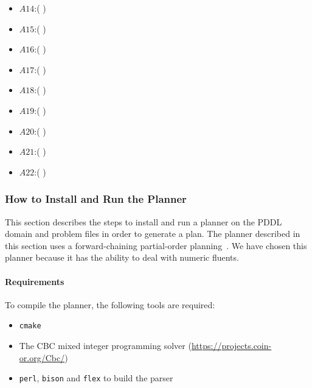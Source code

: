 \begin{itemize}
\item $A14$:(      )
\item $A15$:(     )
\item $A16$:(      )
\item $A17$:(      )
\item $A18$:(     )
\item $A19$:(    )
\item $A20$:(    )
\item $A21$:(    )
\item $A22$:(   )
\end{itemize}

\subsubsection{How to Install and Run the Planner}\label{section:planner}
This section describes the steps to install and run a planner on the PDDL domain and problem files in order to generate a plan. The planner described in this section uses a forward-chaining partial-order planning~\cite{Coles.ICAPS.2010}. We have chosen this planner because it has the ability to deal with numeric fluents.

\paragraph{Requirements}
To compile the planner, the following tools are required:
\begin{itemize}
\item \texttt{cmake}
\item The CBC mixed integer programming solver (\url{https://projects.coin-or.org/Cbc/})
\item \texttt{perl}, \texttt{bison} and \texttt{flex} to build the parser
\end{itemize}

